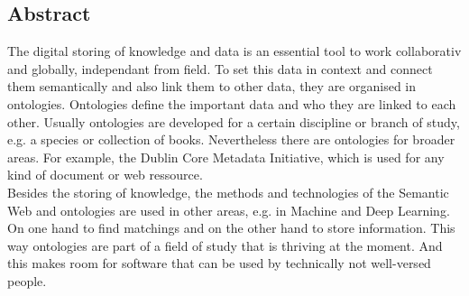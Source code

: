 %
\pagestyle{empty}

\subsection*{Abstract}

The digital storing of knowledge and data is an essential tool to work
collaborativ and globally, independant from  field. To set this data in context
and connect them semantically and also link them to other data, they are
organised in ontologies. Ontologies define the important data and who they are
linked to each other. Usually ontologies are developed for a certain discipline
or branch of study, e.g. a species or collection of books. Nevertheless there
are ontologies for broader areas. For example, the Dublin Core Metadata
Initiative, which is used for any kind of document or web ressource.\\
Besides the storing of knowledge, the methods and technologies of the Semantic
Web and ontologies are used in other areas, e.g. in Machine and Deep Learning.
On one hand to find matchings and on the other hand to store information. This
way ontologies are part of a field of study that is thriving at the moment. And
this makes room for software that can be used by technically not well-versed
people. 

\cleardoublepage